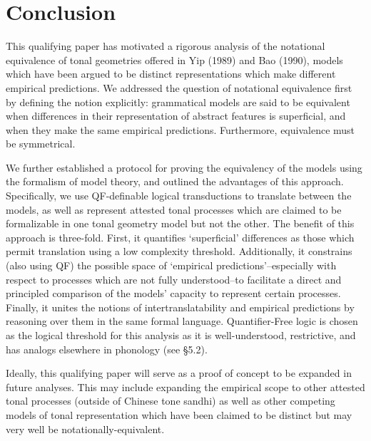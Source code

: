 \documentclass{article}
\begin{document}
\section{Conclusion}
This qualifying paper has motivated a rigorous analysis of the notational equivalence of tonal geometries offered in Yip (1989) and Bao (1990), models which have been argued to be distinct representations which make different empirical predictions. We addressed the question of notational equivalence first by defining the notion explicitly: grammatical models are said to be equivalent when differences in their representation of abstract features is superficial, and when they make the same empirical predictions. Furthermore, equivalence must be symmetrical. \par
We further established a protocol for proving the equivalency of the models using the formalism of model theory, and outlined the advantages of this approach. Specifically, we use QF-definable logical transductions to translate between the models, as well as represent attested tonal processes which are claimed to be formalizable in one tonal geometry model but not the other. The benefit of this approach is three-fold. First, it quantifies `superficial' differences as those which permit translation using a low complexity threshold. Additionally, it constrains (also using QF) the possible space of `empirical predictions'--especially with respect to processes which are not fully understood--to facilitate a direct and principled comparison of the models' capacity to represent certain processes. Finally, it unites the notions of intertranslatability and empirical predictions by reasoning over them in the same formal language. Quantifier-Free logic is chosen as the logical threshold for this analysis as it is well-understood, restrictive, and has analogs elsewhere in phonology (see \S5.2).\par
Ideally, this qualifying paper will serve as a proof of concept to be expanded in future analyses. This may include expanding the empirical scope to other attested tonal processes (outside of Chinese tone sandhi) as well as other competing models of tonal representation which have been claimed to be distinct but may very well be notationally-equivalent.


\end{document}
